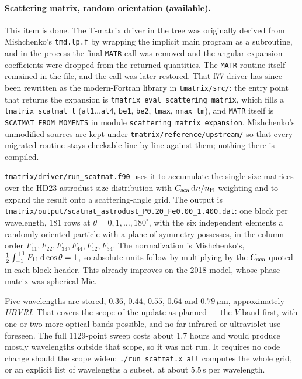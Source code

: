 \documentclass{my_memo}
\newcommand{\code}[1]{\texttt{#1}}
\newcommand{\um}{\ensuremath{\,\mu\mathrm{m}}}
\begin{document}
\paragraph{Scattering matrix, random orientation (available).} This item
is done. The T-matrix driver in the tree was originally derived from
Mishchenko's \code{tmd.lp.f} by wrapping the implicit main program as a
subroutine, and in the process the final \code{MATR} call was removed and the
angular expansion coefficients were dropped from the returned quantities. The
\code{MATR} routine itself remained in the file, and the call was later
restored. That f77 driver has since been rewritten as the modern-Fortran
library in \code{tmatrix/src/}: the entry point that returns the expansion is
\code{tmatrix\_eval\_scattering\_matrix}, which fills a
\code{tmatrix\_scatmat\_t} (\code{al1}$\ldots$\code{al4}, \code{be1},
\code{be2}, \code{lmax}, \code{nmax\_tm}), and \code{MATR} itself is
\code{SCATMAT\_FROM\_MOMENTS} in module \code{scattering\_matrix\_expansion}.
Mishchenko's unmodified sources are kept under
\code{tmatrix/reference/upstream/} so that every migrated routine stays
checkable line by line against them; nothing there is compiled.

\code{tmatrix/driver/run\_scatmat.f90} uses it to accumulate the
single-size matrices over the HD23 astrodust size distribution with
$C_{\rm sca}\,{\rm d}n/n_{\rm H}$ weighting and to expand the result onto
a scattering-angle grid. The output is
\code{tmatrix/output/scatmat\_astrodust\_P0.20\_Fe0.00\_1.400.dat}: one
block per wavelength, $181$ rows at $\theta = 0, 1, \ldots, 180^\circ$,
with the six independent elements a randomly oriented particle with a
plane of symmetry possesses, in the column order $F_{11}, F_{22},
F_{33}, F_{44}, F_{12}, F_{34}$. The normalization is Mishchenko's,
$\tfrac{1}{2}\int_{-1}^{+1} F_{11}\,{\rm d}\cos\theta = 1$, so absolute
units follow by multiplying by the $C_{\rm sca}$ quoted in each block
header. This already improves on the 2018 model, whose phase matrix was
spherical Mie.

Five wavelengths are stored, $0.36$, $0.44$, $0.55$, $0.64$ and
$0.79\um$, approximately \textit{UBVRI}. That covers the scope of the update as
planned --- the $V$ band first, with one or two more optical bands
possible, and no far-infrared or ultraviolet use foreseen. The full
1129-point sweep costs about 1.7 hours and would produce mostly
wavelengths outside that scope, so it was not run. It requires no code
change should the scope widen: \code{./run\_scatmat.x all} computes the
whole grid, or an explicit list of wavelengths a subset, at about
$5.5\,$s per wavelength.
\end{document}
